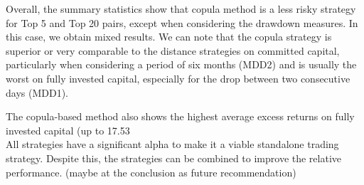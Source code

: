 \documentclass[a4paper]{article}
\begin{document}
Overall, the summary statistics show that copula method is a less risky strategy for Top 5 and Top 20 pairs, except when considering the drawdown measures. In this case, we obtain mixed results. We can note that the copula strategy is superior or very comparable to the distance strategies on committed capital, particularly when considering a period of six months (MDD2) and is usually the worst on fully invested capital, especially for the drop between two consecutive days (MDD1).

The copula-based method also shows the highest average excess returns on fully invested capital (up to 17.53\\%

	
	
All strategies have a significant alpha to make it a viable standalone trading strategy. Despite this, the strategies can be combined to improve the relative performance. (maybe at the conclusion as future recommendation)
\end{document}
